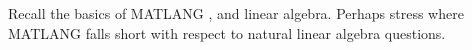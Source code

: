 Recall the basics of MATLANG \cite{matlang}, and linear algebra. Perhaps stress where MATLANG falls short with respect to natural linear algebra questions.